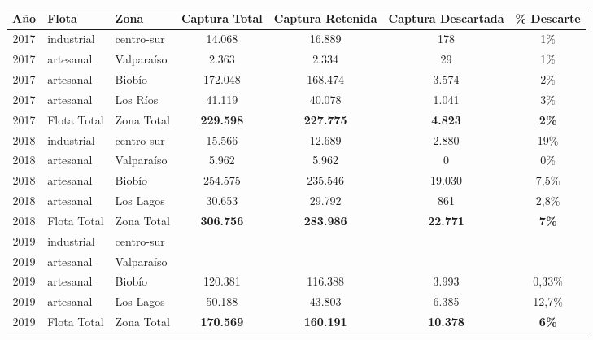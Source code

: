 \documentclass[
  spanish,
]{article}
\begin{document}
\begin{table}[h]
    \centering
    \resizebox{15cm}{!} {
    \begin{tabular}{|c|l|l|c|c|c|c|}
    \hline
Año  &Flota       &Zona       &Captura Total &Captura Retenida &Captura Descartada &\% Descarte     \\ \hline
2017 &industrial  &centro-sur &14.068        &16.889           &178                &1\%             \\
2017 &artesanal   &Valparaíso &2.363         &2.334            &29                 &1\%             \\
2017 &artesanal   &Biobío     &172.048       &168.474          &3.574              &2\%             \\
2017 &artesanal   &Los Ríos   &41.119        &40.078           &1.041              &3\%             \\ \hline
2017 &Flota Total &Zona Total &\textbf{229.598} &\textbf{227.775} &\textbf{4.823}  &\textbf{2\%}    \\ \hline
2018 &industrial  &centro-sur &15.566        &12.689           &2.880              &19\%            \\
2018 &artesanal   &Valparaíso &5.962         &5.962            &0                  &0\%             \\
2018 &artesanal   &Biobío     &254.575       &235.546          &19.030             &7,5\%           \\
2018 &artesanal   &Los Lagos  &30.653        &29.792           &861                &2,8\%           \\ \hline
2018 &Flota Total &Zona Total &\textbf{306.756} &\textbf{283.986} &\textbf{22.771} &\textbf{7\%}    \\ \hline
2019 &industrial  &centro-sur &              &                 &                   &                \\
2019 &artesanal   &Valparaíso &              &                 &                   &                \\
2019 &artesanal   &Biobío     &120.381       &116.388          &3.993              &0,33\%          \\
2019 &artesanal   &Los Lagos  &50.188        &43.803           &6.385              &12,7\%          \\ \hline
2019 &Flota Total &Zona Total &\textbf{170.569} &\textbf{160.191}  &\textbf{10.378}&\textbf{6\%}    \\ \hline
  \end{tabular}}
        \end{table}
\end{document}
